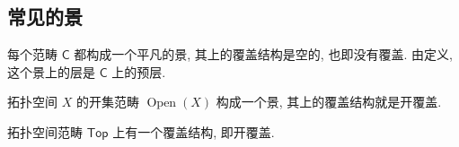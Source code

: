 
%




\subsection{常见的景}


\begin{example}
    {}
    每个范畴 $\mathsf C$ 都构成一个平凡的景, 其上的覆盖结构是空的,
    也即没有覆盖. 由定义, 这个景上的层是 $\mathsf C$ 上的预层.
\end{example}

\begin{example}
    [label={topological-space-as-site}]
    {}
    拓扑空间 $X$ 的开集范畴 $\operatorname{Open}(X)$ 构成一个景, 其上的覆盖结构就是开覆盖.
\end{example}


\begin{example}
    {}
    拓扑空间范畴 $\mathsf {Top}$ 上有一个覆盖结构, 即开覆盖. %
\end{example}

